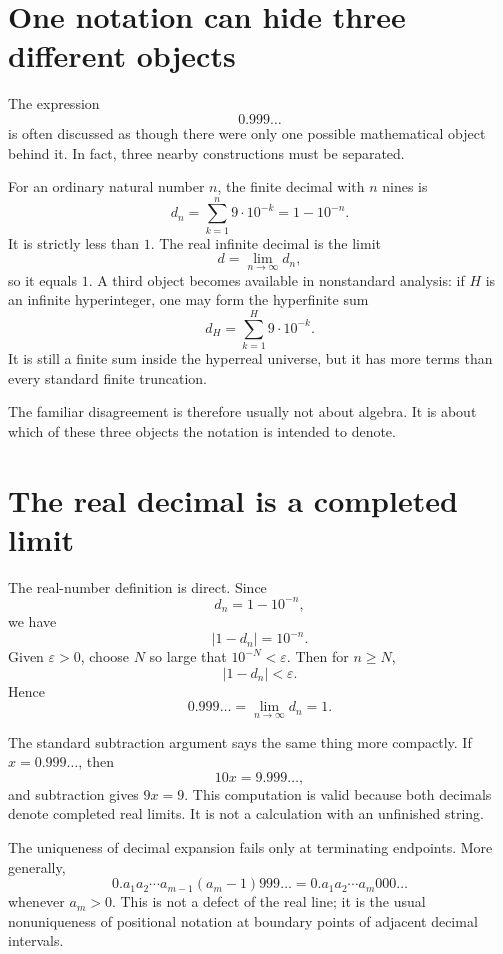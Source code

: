 
\section{One notation can hide three different objects}

The expression
\[
  0.999\ldots
\]
is often discussed as though there were only one possible mathematical object behind it.  In fact, three nearby constructions must be separated.

For an ordinary natural number \(n\), the finite decimal with \(n\) nines is
\[
  d_n=\sum_{k=1}^{n}9\cdot10^{-k}=1-10^{-n}.
\]
It is strictly less than \(1\).  The real infinite decimal is the limit
\[
  d=\lim_{n\to\infty}d_n,
\]
so it equals \(1\).  A third object becomes available in nonstandard analysis: if \(H\) is an infinite hyperinteger, one may form the hyperfinite sum
\[
  d_H=\sum_{k=1}^{H}9\cdot10^{-k}.
\]
It is still a finite sum inside the hyperreal universe, but it has more terms than every standard finite truncation.

The familiar disagreement is therefore usually not about algebra.  It is about which of these three objects the notation is intended to denote.

\section{The real decimal is a completed limit}

The real-number definition is direct.  Since
\[
  d_n=1-10^{-n},
\]
we have
\[
  |1-d_n|=10^{-n}.
\]
Given \(\varepsilon>0\), choose \(N\) so large that \(10^{-N}<\varepsilon\).  Then for \(n\ge N\),
\[
  |1-d_n|<\varepsilon.
\]
Hence
\[
  \boxed{0.999\ldots=\lim_{n\to\infty}d_n=1.}
\]

The standard subtraction argument says the same thing more compactly.  If \(x=0.999\ldots\), then
\[
  10x=9.999\ldots,
\]
and subtraction gives \(9x=9\).  This computation is valid because both decimals denote completed real limits.  It is not a calculation with an unfinished string.

The uniqueness of decimal expansion fails only at terminating endpoints.  More generally,
\[
  0.a_1a_2\cdots a_{m-1}(a_m-1)999\ldots
  =0.a_1a_2\cdots a_m000\ldots
\]
whenever \(a_m>0\).  This is not a defect of the real line; it is the usual nonuniqueness of positional notation at boundary points of adjacent decimal intervals.

